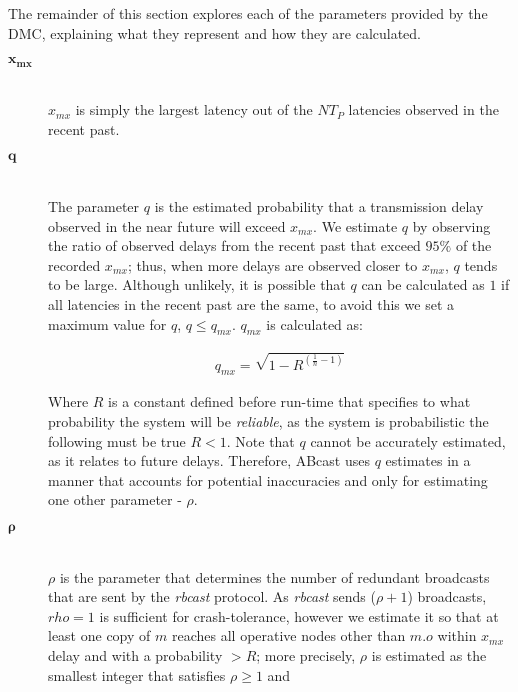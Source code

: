         The remainder of this section explores each of the parameters provided by the DMC, explaining what they represent and how they are calculated.  
        
        \begin{description}
        \item[\Huge$\boldsymbol{x_{mx}}$] \hfill \\
        $x_{mx}$ is simply the largest latency out of the $NT_P$ latencies observed in the recent past.  
        
        \item[\Huge$\boldsymbol{q}$] \hfill \\
                The parameter $q$ is the estimated probability that a transmission delay observed in the near future will exceed $x_{mx}$.  We estimate $q$ by observing the ratio of observed delays from the recent past that exceed $95\%$ of the recorded $x_{mx}$; thus, when more delays are observed closer to $x_{mx}$, $q$ tends to be large.  Although unlikely, it is possible that $q$ can be calculated as $1$ if all latencies in the recent past are the same, to avoid this we set a maximum value for $q$, $ q \leq q_{mx}$.  $q_{mx}$ is calculated as: 

        \begin{equation*}
		     \begin{aligned}
		          q_{mx} = \sqrt{1 - R^{(\frac{1}{n} - 1)}}
		     \end{aligned}
        \end{equation*}
        
        Where $R$ is a constant defined before run-time that specifies to what probability the system will be \emph{reliable}, as the system is probabilistic the following must be true $R < 1$.  Note that $q$ cannot be accurately estimated, as it relates to future delays.  Therefore, \textsf{ABcast} uses $q$ estimates in a manner that accounts for potential inaccuracies and only for estimating one other parameter - $\rho$.
	
	    \item[\Huge$\boldsymbol{\rho}$] \hfill \\
	    $\rho$ is the parameter that determines the number of redundant broadcasts that are sent by the \emph{rbcast} protocol.  As \emph{rbcast} sends ($\rho + 1$) broadcasts, $rho = 1$ is sufficient for crash-tolerance, however we estimate it so that at least one copy of $m$ reaches all operative nodes other than $m.o$ within $x_{mx}$ delay and with a probability $> R$; more precisely, $\rho$ is estimated as the smallest integer that satisfies $\rho \geq 1$ and


\end{description}
